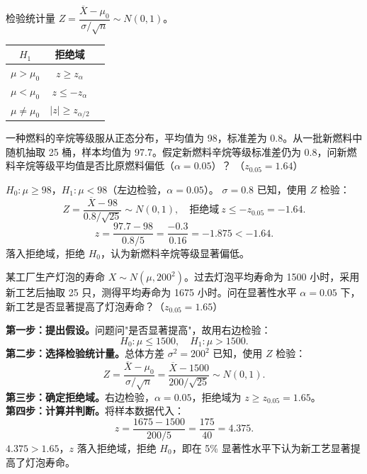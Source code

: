﻿\documentclass[lang=cn,11pt]{elegantbook}
\begin{document}
\begin{property}[Z 检验（\(\sigma^2\) 已知）]\label{prop:z-test}
检验统计量 \(Z = \dfrac{\overline{X}-\mu_0}{\sigma/\sqrt{n}} \sim N(0,1)\)。

\begin{center}
\begin{tabular}{ccc}
\toprule
\(H_1\) & 拒绝域 \\
\midrule
\(\mu > \mu_0\) & \(z \geq z_\alpha\) \\[4pt]
\(\mu < \mu_0\) & \(z \leq -z_\alpha\) \\[4pt]
\(\mu \neq \mu_0\) & \(|z| \geq z_{\alpha/2}\) \\
\bottomrule
\end{tabular}
\end{center}
\end{property}

\begin{exercise} \label{ex:ht_z_left}
一种燃料的辛烷等级服从正态分布，平均值为 98，标准差为 0.8。从一批新燃料中随机抽取 25 桶，样本均值为 97.7。假定新燃料辛烷等级标准差仍为 0.8，问新燃料辛烷等级平均值是否比原燃料偏低（\(\alpha=0.05\)）？
（\(z_{0.05}=1.64\)）
\end{exercise}
\begin{solution}
\(H_0\colon\mu\geq98\)，\(H_1\colon\mu<98\)（左边检验，\(\alpha=0.05\)）。
\(\sigma=0.8\) 已知，使用 \(Z\) 检验：
\[
Z=\frac{\overline{X}-98}{0.8/\sqrt{25}}\sim N(0,1),\quad\text{拒绝域}\ z\leq -z_{0.05}=-1.64.
\]
\[
z=\frac{97.7-98}{0.8/5}=\frac{-0.3}{0.16}=-1.875<-1.64.
\]
落入拒绝域，拒绝 \(H_0\)，认为新燃料辛烷等级显著偏低。
\end{solution}



\begin{exercise}\label{exer:9-z-test}
某工厂生产灯泡的寿命 \(X \sim N(\mu, 200^2)\)。过去灯泡平均寿命为 1500 小时，采用新工艺后抽取 25 只，测得平均寿命为 1675 小时。问在显著性水平 \(\alpha = 0.05\) 下，新工艺是否显著提高了灯泡寿命？（\(z_{0.05}=1.65\)）
\end{exercise}
\begin{solution}
\textbf{第一步：提出假设。}问题问"是否显著提高"，故用右边检验：
\[
H_0\colon \mu \leq 1500,\quad H_1\colon \mu > 1500.
\]
\textbf{第二步：选择检验统计量。}总体方差 \(\sigma^2=200^2\) 已知，使用 \(Z\) 检验：
\[
Z = \frac{\overline{X}-\mu_0}{\sigma/\sqrt{n}} = \frac{\overline{X}-1500}{200/\sqrt{25}} \sim N(0,1).
\]
\textbf{第三步：确定拒绝域。}右边检验，\(\alpha=0.05\)，拒绝域为 \(z \geq z_{0.05}=1.65\)。\\
\textbf{第四步：计算并判断。}将样本数据代入：
\[
z = \frac{1675-1500}{200/5} = \frac{175}{40} = 4.375.
\]
\(4.375 > 1.65\)，\(z\) 落入拒绝域，拒绝 \(H_0\)，即在 5\% 显著性水平下认为新工艺显著提高了灯泡寿命。
\end{solution}
\end{document}
